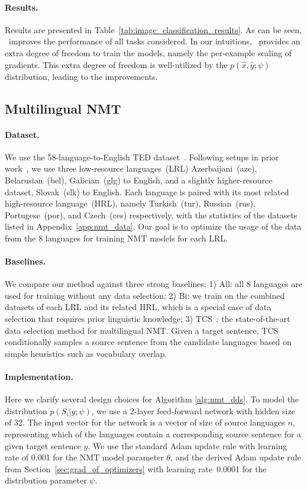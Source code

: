 \paragraph{Results.} Results are presented in Table~\ref{tab:image_classification_results}. As can be seen, \dds~improves the performance of all tasks considered. In our intuitions, \dds~provides an extra degree of freedom to train the models, namely the per-example scaling of gradients. This extra degree of freedom is well-utilized by the $p(\hat{x}, \hat{y}; \psi)$ distribution, leading to the improvements.


\subsection{Multilingual NMT}
\paragraph{Dataset.}
We use the 58-language-to-English TED dataset~\citep{ted_pretrain_emb}. 
Following setups in prior work~\citep{ted_pretrain_emb,rapid_adapt_nmt,SDE}, we use three low-resource languages~(LRL) Azerbaijani~(aze), Belarusian~(bel), Galician~(glg) to English,
and a slightly higher-resource dataset, Slovak~(slk) to English. Each language is paired with its most related high-resource language~(HRL), namely Turkish~(tur), Russian~(rus), Portugese~(por), and Czech~(ces) respectively, with the statistics of the datasets listed in Appendix~\ref{app:nmt_data}. Our goal is to optimize the usage of the data from the 8 languages for training NMT models for each LRL. 

\paragraph{Baselines.} We compare our method against three strong baselines: 1) All: all 8 languages are used for training without any data selection; 2) Bi: we train on the combined datasets of each LRL and its related HRL, which is a special case of data selection that requires prior linguistic knowledge; 3) TCS~\citep{TCS}: the state-of-the-art data selection method for multilingual NMT. Given a target sentence, TCS conditionally samples a source sentence from the candidate languages based on simple heuristics such as vocabulary overlap.

\paragraph{Implementation.} Here we clarify several design choices for Algorithm \ref{alg:nmt_dds}. To model the distribution $p(S_i|y;\psi)$, we use a 2-layer feed-forward network with hidden size of 32. The input vector for the network is a vector of size of source languages $n$, representing which of the languages contain a corresponding source sentence for a given target sentence $y$. We use the standard Adam update rule with learning rate of 0.001 for the NMT model parameter $\theta$, and the derived Adam update rule from Section~\ref{sec:grad_of_optimizers} with learning rate~0.0001 for the distribution parameter $\psi$. 

